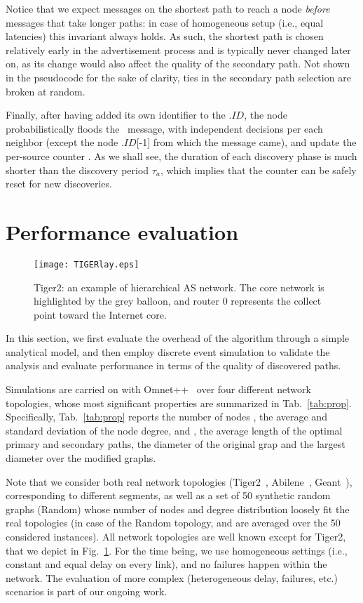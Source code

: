 \documentclass[conference]{IEEEtran}
\newcommand{\tiger}{Tiger2}
\newcommand{\tadvertise}{\ensuremath{\tau_{a}}} \newcommand{\trefresh}{\ensuremath{\tau_{r}}} \newcommand{\tm}{\tadvertise} \newcommand{\tr}{\trefresh}
\newcommand{\FW}{\text{ADV}}
\newcommand{\nid}{\ensuremath{ID}}
\begin{document}
Notice that we expect messages on the shortest path to reach a node \emph{before} messages that take longer paths: in case of homogeneous setup (i.e., equal latencies) this invariant always holds. As such, the shortest path is chosen relatively early in the advertisement process and is typically never changed later on, as its change would also affect the quality of the secondary path. Not shown in the pseudocode for the sake of clarity,  ties in the secondary path selection are broken at random. 

Finally, after having added its own identifier to the \FW.\nid, the node probabilistically  floods the \FW\ message, with independent decisions per each neighbor (except the node \FW.\nid[-1] from which the message came), and update the per-source counter . As we shall see, the duration of each discovery phase is much shorter than the discovery period \tadvertise, which implies that the counter  can be safely reset for new discoveries. 


\section{Performance evaluation}
\label{sec:Perf}


\begin{figure}[t]
\begin{center}
\texttt{[image: TIGERlay.eps]}
\end{center}
\caption{\tiger: an example of hierarchical AS network.  The core network is highlighted by the grey balloon, and router 0 represents the collect point toward the Internet core.}
\label{fig:tiger}
\end{figure}

In this section, we first evaluate the overhead of the algorithm through a simple analytical model, and then employ discrete event simulation to validate the  analysis and evaluate performance in 
 terms of the quality of discovered paths.

Simulations are carried on with Omnet++~\cite{Varga10Omnet} over four
different network topologies, whose  most significant properties are summarized
in Tab.~\ref{tab:prop}.  
Specifically, Tab.~\ref{tab:prop} reports the number of nodes , the
average and standard deviation of the node degree,  and ,	the average length of the optimal primary  and secondary  paths, the diameter  of the original grap  and the largest diameter  over the modified  graphs. 

 Note that we consider both real network topologies (Tiger2~\cite{tiger2}, Abilene~\cite{abilene}, Geant~\cite{geant}), corresponding to different segments,  as well as a set of 50 synthetic random graphs (Random) whose number of nodes and degree distribution loosely fit the real topologies (in case of the Random topology,   and  are averaged over the 50 considered instances).
All network topologies are well known except for Tiger2, that we depict in Fig.~\ref{fig:tiger}. For the time being, we use homogeneous settings (i.e., constant and equal delay on every link), and no failures happen within the network. The evaluation of more complex (heterogeneous delay, failures, etc.) scenarios is part of our ongoing work.
\end{document}
